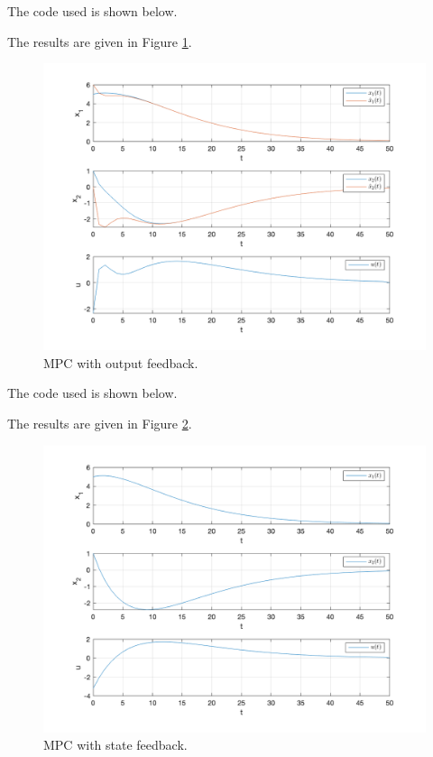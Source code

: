 \documentclass[11pt, a4paper, english]{NTNUoving}
\begin{document}
\begin{oppgave}
    \begin{punkt}

        The code used is shown below.
        

        The results are given in Figure \ref{fig:3a}.
        \begin{figure}[H]
            \centering
            \includegraphics[width=1.0\textwidth]{../task3a.png}
            \caption{MPC with output feedback.}
            \label{fig:3a}
        \end{figure}
    \end{punkt}

    The code used is shown below.
    

    \begin{punkt}

        The results are given in Figure \ref{fig:3b}.
        \begin{figure}[H]
            \centering
            \includegraphics[width=1.0\textwidth]{../task3b.png}
            \caption{MPC with state feedback.}
            \label{fig:3b}
        \end{figure}
    \end{punkt}
\end{oppgave}
\end{document}

